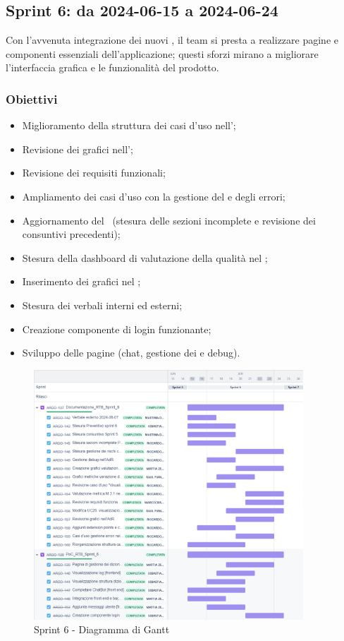 \subsection{Sprint 6: da 2024-06-15 a 2024-06-24}
\par Con l'avvenuta integrazione dei nuovi , il team si presta a realizzare pagine e componenti essenziali dell'applicazione; questi sforzi mirano a migliorare l'interfaccia grafica e le funzionalità del prodotto.


\subsubsection{Obiettivi}
\begin{itemize}
  \item Miglioramento della struttura dei casi d'uso nell'\AdR;
  \item Revisione dei grafici nell'\AdR;
  \item Revisione dei requisiti funzionali;
  \item Ampliamento dei casi d'uso con la gestione del  e degli errori;
  \item Aggiornamento del \PdP\ (stesura delle sezioni incomplete e revisione dei consuntivi precedenti);
  \item Stesura della dashboard di valutazione della qualità nel \PdQ;
  \item Inserimento dei grafici nel \PdQ;
  \item Stesura dei verbali interni ed esterni;
  \item Creazione componente di login funzionante;
  \item Sviluppo delle pagine  (chat, gestione dei  e debug).
\end{itemize}

\begin{figure}[H]
  \centering
  \includegraphics[width=0.90\textwidth]{assets/Pianificazione/Sprint-6/gantt.png}
  \caption{Sprint 6 - Diagramma di Gantt}\label{fig:sprint-6-gantt}
\end{figure}
